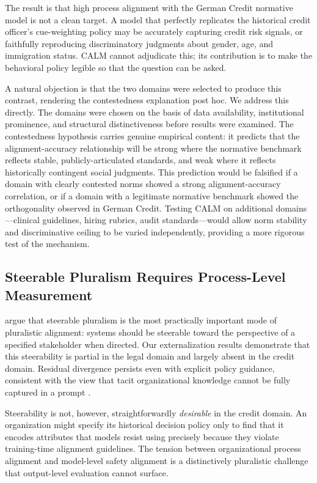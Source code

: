 \documentclass{article}
\begin{document}
The result is that high process alignment with the German Credit normative model is not a clean target. A model that perfectly replicates the historical credit officer's cue-weighting policy may be accurately capturing credit risk signals, or faithfully reproducing discriminatory judgments about gender, age, and immigration status. CALM cannot adjudicate this; its contribution is to make the behavioral policy legible so that the question can be asked.

A natural objection is that the two domains were selected to produce this contrast, rendering the contestedness explanation post hoc. We address this directly. The domains were chosen on the basis of data availability, institutional prominence, and structural distinctiveness before results were examined. The contestedness hypothesis carries genuine empirical content: it predicts that the alignment-accuracy relationship will be strong where the normative benchmark reflects stable, publicly-articulated standards, and weak where it reflects historically contingent social judgments. This prediction would be falsified if a domain with clearly contested norms showed a strong alignment-accuracy correlation, or if a domain with a legitimate normative benchmark showed the orthogonality observed in German Credit. Testing CALM on additional domains—clinical guidelines, hiring rubrics, audit standards—would allow norm stability and discriminative ceiling to be varied independently, providing a more rigorous test of the mechanism.

\subsection{Steerable Pluralism Requires Process-Level Measurement}

\citet{sorensen2024roadmap} argue that steerable pluralism is the most practically important mode of pluralistic alignment: systems should be steerable toward the perspective of a specified stakeholder when directed. Our externalization results demonstrate that this steerability is partial in the legal domain and largely absent in the credit domain. Residual divergence persists even with explicit policy guidance, consistent with the view that tacit organizational knowledge cannot be fully captured in a prompt \citep{polanyi1966tacit}.

Steerability is not, however, straightforwardly \emph{desirable} in the credit domain. An organization might specify its historical decision policy only to find that it encodes attributes that models resist using precisely because they violate training-time alignment guidelines. The tension between organizational process alignment and model-level safety alignment is a distinctively pluralistic challenge that output-level evaluation cannot surface.
\end{document}
